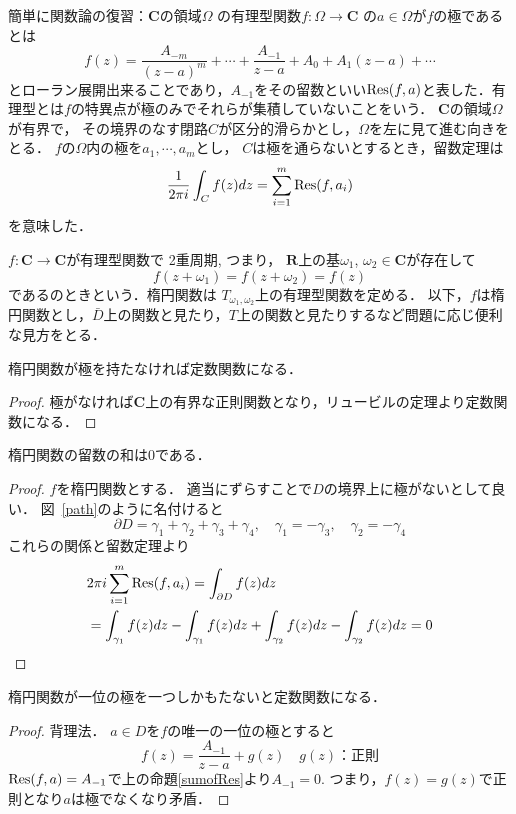 簡単に関数論の復習：$\mathbf C$の領域$\Omega$
の有理型関数$f:\Omega\to \mathbf C$
の$a\in \Omega$が$f$の極であるとは
\[
	f(z) = \frac{A_{-m}}{(z-a)^m}+\cdots +\frac{A_{-1}}{z-a}
	+ A_0+A_1(z-a) +\cdots 
\]
とローラン展開出来ることであり，$A_{-1}$をその留数といい$\operatorname{Res}(f,a)$と表した．有理型とは$f$の特異点が極のみでそれらが集積していないことをいう．
$\mathbf C$の領域$\Omega$が有界で，
その境界のなす閉路$C$が区分的滑らかとし，$\Omega$を左に見て進む向きをとる．
$f$の$\Omega$内の極を$a_1, \cdots, a_m$とし，
$C$は極を通らないとするとき，留数定理は
\[
	\frac1{2\pi i}\int_C f(z)dz = \sum_{i=1}^m\operatorname{Res}(f,a_i)
\]
を意味した．

$f:\mathbf C\to\mathbf C $が有理型関数で
2重周期, つまり，
$\mathbf R$上の基$\omega_1$, $\omega_2\in \mathbf C$が存在して
\begin{equation}\label{period}
	f(z+\omega_1)=f(z+\omega_2)=f(z)
\end{equation}
であるのときという．楕円関数は
$T_{\omega_1,\omega_2} $上の有理型関数を定める．
以下，$f$は楕円関数とし，$\bar D$上の関数と見たり，$T$上の関数と見たりするなど問題に応じ便利な見方をとる．

\begin{Prop}\label{const}
楕円関数が極を持たなければ定数関数になる．
\end{Prop}
\begin{proof}
極がなければ$\mathbf C$上の有界な正則関数となり，リュービルの定理より定数関数になる．
\end{proof}


\begin{Prop}\label{sumofRes}
楕円関数の留数の和は$0$である．
\end{Prop}
\begin{proof}
$f$を楕円関数とする．
適当にずらすことで$D$の境界上に極がないとして良い．
図~\ref{path}のように名付けると
\[
	\partial D=\gamma_1+\gamma_2+\gamma_3+\gamma_4,\quad
	\gamma_1=-\gamma_3,\quad \gamma_2=-\gamma_4
\]
これらの関係と留数定理より
\[
\begin{split}
	&2\pi i\sum_{i=1}^m\operatorname{Res}(f,a_i)
	=\int_{\partial D} f(z)dz \\
	&= \int_{\gamma_1} f(z)dz
	-\int_{\gamma_1} f(z)dz
	+\int_{\gamma_2} f(z)dz-\int_{\gamma_2}f(z)dz=0
\end{split}
\]

\end{proof}

\begin{Prop}
楕円関数が一位の極を一つしかもたないと定数関数になる．
\end{Prop}
\begin{proof}
背理法．
$a\in D$を$f$の唯一の一位の極とすると
\[
	f(z)=\frac{A_{-1}}{z-a}
	+ g(z)\quad g(z)\text{：正則}
\]
$\operatorname{Res}(f,a)=A_{-1}$で上の命題\ref{sumofRes}より$A_{-1}=0$.
つまり，$f(z)=g(z)$で正則となり$a$は極でなくなり矛盾．
\end{proof}



